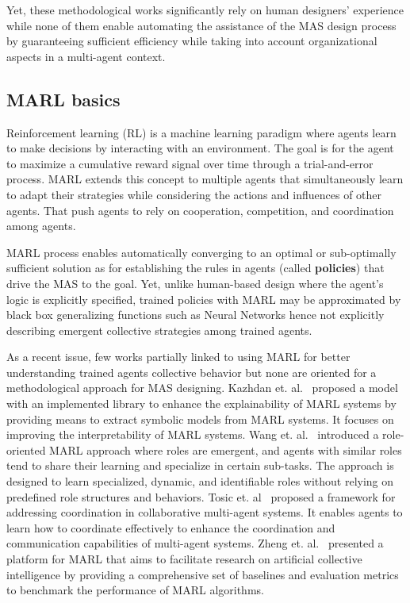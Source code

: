 \documentclass[runningheads]{llncs}
\begin{document}
Yet, these methodological works significantly rely on human designers' experience while none of them enable automating the assistance of the MAS design process by guaranteeing sufficient efficiency while taking into account organizational aspects in a multi-agent context.

\subsection{MARL basics}

Reinforcement learning (RL) is a machine learning paradigm where agents learn to make decisions by interacting with an environment. The goal is for the agent to maximize a cumulative reward signal over time through a trial-and-error process.
MARL extends this concept to multiple agents that simultaneously learn to adapt their strategies while considering the actions and influences of other agents. That push agents to rely on cooperation, competition, and coordination among agents.

MARL process enables automatically converging to an optimal or sub-optimally sufficient solution as for establishing the rules in agents (called \textbf{policies}) that drive the MAS to the goal. Yet, unlike human-based design where the agent's logic is explicitly specified, trained policies with MARL may be approximated by black box generalizing functions such as Neural Networks hence not explicitly describing emergent collective strategies among trained agents.

As a recent issue, few works partially linked to using MARL for better understanding trained agents collective behavior but none are oriented for a methodological approach for MAS designing.
Kazhdan et. al.~\cite{Kazhdan2020} proposed a model with an implemented library to enhance the explainability of MARL systems by providing means to extract symbolic models from MARL systems. It focuses on improving the interpretability of MARL systems.
Wang et. al.~\cite{Wang2020} introduced a role-oriented MARL approach where roles are emergent, and agents with similar roles tend to share their learning and specialize in certain sub-tasks. The approach is designed to learn specialized, dynamic, and identifiable roles without relying on predefined role structures and behaviors.
Tosic et. al~\cite{Tosic2010} proposed a framework for addressing coordination in collaborative multi-agent systems. It enables agents to learn how to coordinate effectively to enhance the coordination and communication capabilities of multi-agent systems.
Zheng et. al.~\cite{Zheng2018} presented a platform for MARL that aims to facilitate research on artificial collective intelligence by providing a comprehensive set of baselines and evaluation metrics to benchmark the performance of MARL algorithms.
\end{document}
